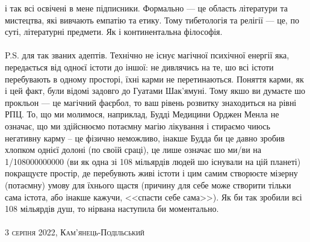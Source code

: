 і так всі освічені в мене підписники. Формально --- це область
літератури та мистецтва, які вивчають емпатію та етику. Тому
тибетологія та релігії --- це, по суті, літературні предмети.
Як і континентальна філософія.
\\
\\
P.S. для так званих адептів. Технічно не існує магічної психічної
енергії яка, передається від одноєї істоти до іншої: не дивлячись
на те, шо всі істоти перебувають в одному просторі, їхні карми
не перетинаються. Поняття карми, як і цей факт, були відомі
задовго до Гуатами Шак'ямуні. Тому якшо ви думаєте шо
прокльон --- це магічний фаєрбол, то ваш рівень розвитку
знаходиться на рівні РПЦ. То, що ми молимося, наприклад, Будді
Медицини Орджен Менла не означає, що ми здійснюємо потаємну
магію лікування і стираємо чиюсь негативну карму -- це фізично
неможливо, інакше Будда би це давно зробив хлопком однієї
долоні (по своїй сраці), це лише означає шо ми/ви на 1/108000000000 (ви
як одна зі 108 мільярдів людей шо існували на цій планеті) покращуєте
простір, де перебувють живі істоти і цим самим створюєте мізерну (потаємну)
умову для їхнього щастя (причину для себе може створити тільки сама
істота, або інакше кажучи, <<спасти себе сама>>). Як би так зробили
всі 108 мільярдів душ, то нірвана наступила би моментально.
\\
\\
\textsc{\footnotesize 3 серпня 2022, Кам'янець-Подільський}

\normalsize
